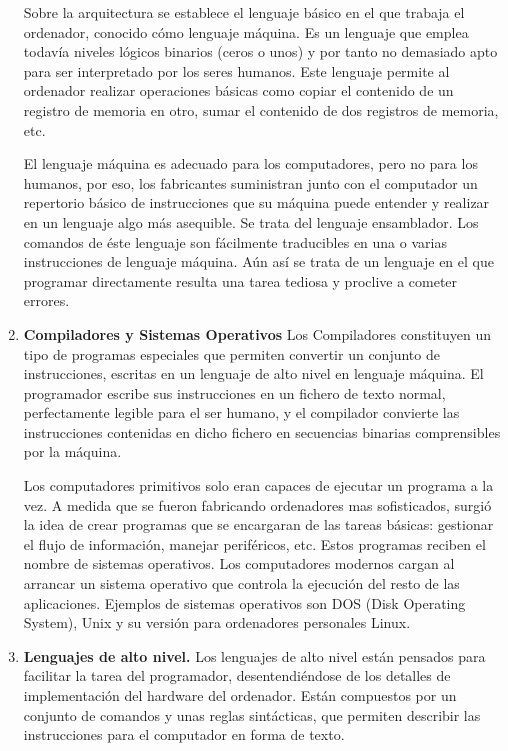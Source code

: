 \begin{paracol}{2}
\begin{enumerate}
Sobre la arquitectura se establece el lenguaje básico en el que trabaja el ordenador, conocido cómo lenguaje máquina. Es un lenguaje que emplea todavía niveles lógicos binarios (ceros o unos) y por tanto no demasiado apto para ser interpretado por los seres humanos. Este lenguaje permite al ordenador realizar operaciones básicas como copiar el contenido de un registro de memoria en otro, sumar el contenido de dos registros de memoria, etc. 

El lenguaje máquina es adecuado para los computadores, pero no para los humanos, por eso, los fabricantes suministran junto con el computador un repertorio básico de instrucciones que su máquina puede entender y realizar en un lenguaje algo más asequible. Se trata del lenguaje ensamblador. Los comandos de éste lenguaje son fácilmente traducibles en una o varias instrucciones de lenguaje máquina.   Aún así se trata de un lenguaje en el que programar directamente resulta una tarea tediosa y proclive a cometer errores. 

\item \textbf{Compiladores y Sistemas Operativos}  
Los Compiladores constituyen un tipo de programas especiales que permiten convertir un conjunto de instrucciones, escritas en un lenguaje de alto nivel en lenguaje máquina. El programador escribe sus instrucciones en un fichero de texto normal, perfectamente legible para el ser humano, y el compilador convierte las instrucciones contenidas en dicho fichero en secuencias binarias comprensibles por la máquina.

Los computadores primitivos solo eran capaces de ejecutar un programa a la vez. A medida que se fueron fabricando ordenadores mas sofisticados, surgió la idea de crear programas que se encargaran de las tareas básicas: gestionar el flujo de información, manejar periféricos, etc. Estos programas reciben el nombre de sistemas operativos. Los computadores modernos cargan al arrancar un sistema operativo que controla la ejecución del resto de las aplicaciones. Ejemplos de sistemas operativos son DOS (Disk Operating System), Unix y su versión para ordenadores personales Linux.

\item \textbf{Lenguajes de alto nivel.} 
Los lenguajes de alto nivel están pensados para facilitar la tarea del programador, desentendiéndose de los detalles de implementación del hardware del ordenador.  Están compuestos por un conjunto de comandos y unas reglas sintácticas, que permiten describir las instrucciones para el computador en forma de texto.


\end{enumerate}
\end{paracol}
